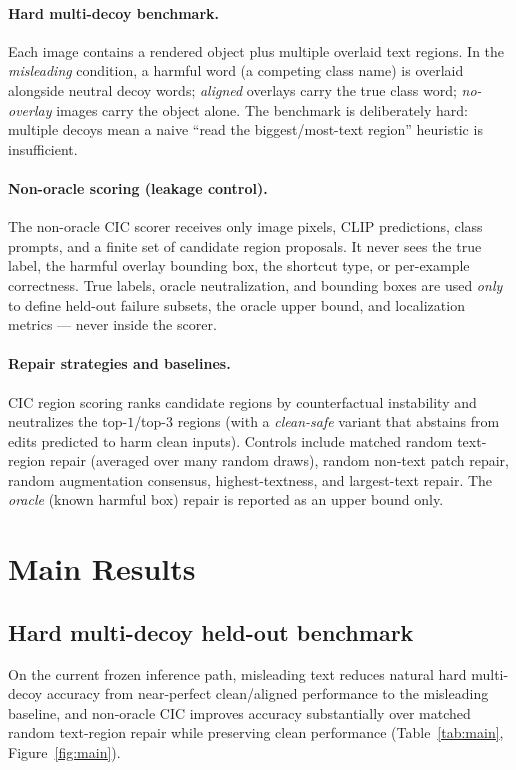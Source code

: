 \documentclass[11pt]{article}
\begin{document}
\paragraph{Hard multi-decoy benchmark.}
Each image contains a rendered object plus multiple overlaid text regions. In the
\emph{misleading} condition, a harmful word (a competing class name) is overlaid
alongside neutral decoy words; \emph{aligned} overlays carry the true class word;
\emph{no-overlay} images carry the object alone. The benchmark is deliberately hard:
multiple decoys mean a naive ``read the biggest/most-text region'' heuristic is
insufficient.

\paragraph{Non-oracle scoring (leakage control).}
The non-oracle CIC scorer receives only image pixels, CLIP predictions, class
prompts, and a finite set of candidate region proposals. It never sees the true
label, the harmful overlay bounding box, the shortcut type, or per-example
correctness. True labels, oracle neutralization, and bounding boxes are used
\emph{only} to define held-out failure subsets, the oracle upper bound, and
localization metrics --- never inside the scorer.

\paragraph{Repair strategies and baselines.}
CIC region scoring ranks candidate regions by counterfactual instability and
neutralizes the top-$1$/top-$3$ regions (with a \emph{clean-safe} variant that
abstains from edits predicted to harm clean inputs). Controls include matched random
text-region repair (averaged over many random draws), random non-text patch repair,
random augmentation consensus, highest-textness, and largest-text repair. The
\emph{oracle} (known harmful box) repair is reported as an upper bound only.

\section{Main Results}\label{sec:results}

\subsection{Hard multi-decoy held-out benchmark}
On the current frozen inference path, misleading text reduces natural hard
multi-decoy accuracy from near-perfect clean/aligned performance to the misleading
baseline, and non-oracle CIC improves accuracy substantially over matched random
text-region repair while preserving clean performance (Table~\ref{tab:main},
Figure~\ref{fig:main}).
\end{document}
